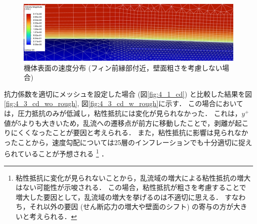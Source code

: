 \documentclass[uplatex,dvipdfmx,a4j,12pt]{jsarticle}
\begin{document}
\begin{figure}[H]
  \centering
  \includegraphics[width=\linewidth]{wall_function/img/4_3_velocity.png}
  \caption{機体表面の速度分布 (フィン前縁部付近，壁面粗さを考慮しない場合)}
  \label{fig:velocity_3}
\end{figure}

抗力係数を適切にメッシュを設定した場合 (図\ref{fig:4_1_cd}) と比較した結果を図\ref{fig:4_3_cd_wo_rough}, 図\ref{fig:4_3_cd_w_rough}に示す．
この場合においては，圧力抵抗のみが低減し，粘性抵抗には変化が見られなかった．
これは，$y^+$値が5よりも大きいため，乱流への遷移点が前方に移動したことで，剥離が起こりにくくなったことが要因と考えられる．
また，粘性抵抗に影響は見られなかったことから，速度勾配については25層のインフレーションでも十分適切に捉えられていることが予想される
\footnote{粘性抵抗に変化が見られないことから，乱流域の増大による粘性抵抗の増大はない可能性が示唆される．
この場合，粘性抵抗が粗さを考慮することで増大した要因として，乱流域の増大を挙げるのは不適切に思える．
すなわち，それ以外の要因 (せん断応力の増大や壁面のシフト) の寄与の方が大きいと考えられる．
}
．
\end{document}
